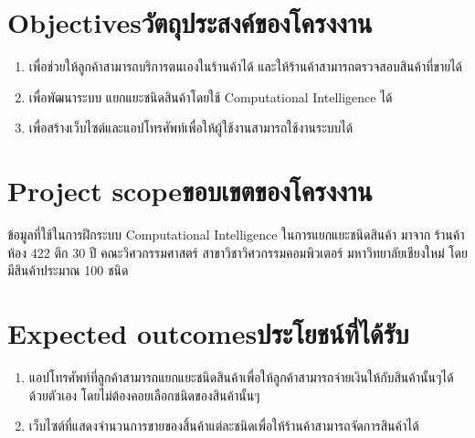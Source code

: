 \section{\ifenglish Objectives\else วัตถุประสงค์ของโครงงาน\fi}
\begin{enumerate}
    \item เพื่อช่วยให้ลูกค้าสามารถบริการตนเองในร้านค้าได้ และให้ร้านค้าสามารถตรวจสอบสินค้าที่ขายได้
    \item เพื่อพัฒนาระบบ แยกแยะชนิดสินค้าโดยใช้ Computational Intelligence ได้
    \item เพื่อสร้างเว็บไซต์และแอปโทรศัพท์เพื่อให้ผู้ใช้งานสามารถใช้งานระบบได้
\end{enumerate}

\section{\ifenglish Project scope\else ขอบเขตของโครงงาน\fi}
ข้อมูลที่ใช้ในการฝึกระบบ Computational Intelligence ในการแยกแยะชนิดสินค้า
มาจาก ร้านค้าห้อง 422 ตึก 30 ปี คณะวิศวกรรมศาสตร์ สาขาวิชาวิศวกรรมคอมพิวเตอร์ มหาวิทยาลัยเชียงใหม่ โดยมีสินค้าประมาณ 100 ชนิด


\section{\ifenglish Expected outcomes\else ประโยชน์ที่ได้รับ\fi}
\begin{enumerate}
    \item แอปโทรศัพท์ที่ลูกค้าสามารถแยกแยะชนิดสินค้าเพื่อให้ลูกค้าสามารถจ่ายเงินให้กับสินค้านั้นๆได้ด้วยตัวเอง โดยไม่ต้องคอยเลือกชนิดของสินค้านั้นๆ
    \item เว็บไซต์ที่แสดงจำนวนการขายของสิ้นค้าแต่ละชนิดเพื่อให้ร้านค้าสามารถจัดการสินค้าได้
\end{enumerate}
